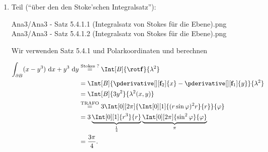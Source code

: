 \begin{solution}
\begin{enumerate}[label = \arabic*.]
    \item Teil (\enquote{über den den Stoke'schen Integralsatz}):
    
    {Ana3/Ana3 - Satz 5.4.1.1 (Integralsatz von Stokes für die Ebene).png}
    {Ana3/Ana3 - Satz 5.4.1.2 (Integralsatz von Stokes für die Ebene).png}

    Wir verwenden Satz 5.4.1 und Polarkoordinaten und berechnen

    \begin{align*}
        \int_{\partial B}
                (x - y^3)
                ~\mathrm d x
            +
            y^3
            ~\mathrm d y
        & \stackrel
        {
            \text{Stokes ?}
        }{=}
        \Int[B]
        {
            \rot \mathbf f
        }{\lambda^2} \\
        & =
        \Int[B]
        {
            \pderivative[][\mathbf f_2]{x}
            -
            \pderivative[][\mathbf f_1]{y}
        }{\lambda^2} \\
        & =
        \Int[B]
        {
            3 y^2
        }{\lambda^2(x, y)} \\
        & \stackrel
        {
            \text{TRAFO}
        }{=}
        3
        \Int[0][2 \pi]
        {
            \Int[0][1]
            {
                (r \sin \varphi)^2 r
            }{r}
        }{\varphi} \\
        & =
        3
        \underbrace
        {
            \Int[0][1]
            {
                r^3
            }{r}
        }_\frac{1}{4}
        \underbrace
        {
            \Int[0][2 \pi]
            {
                \sin^2 \varphi
            }{\varphi}
        }_\pi \\
        & =
        \frac{3 \pi}{4}.
    \end{align*}

\end{enumerate}

\end{solution}

